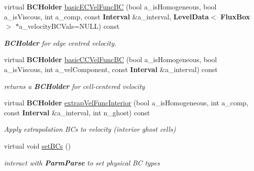 \begin{DoxyCompactItemize}
\item 
\mbox{\label{class_phys_b_c_util_a9c5eb718c29d7e1ac16253ccbf365dd2}} 
virtual \textbf{ B\+C\+Holder} \hyperlink{class_phys_b_c_util_a9c5eb718c29d7e1ac16253ccbf365dd2}{basic\+E\+C\+Vel\+Func\+BC} (bool a\+\_\+is\+Homogeneous, bool a\+\_\+is\+Viscous, int a\+\_\+comp, const \textbf{ Interval} \&a\+\_\+interval, \textbf{ Level\+Data}$<$ \textbf{ Flux\+Box} $>$ $\ast$a\+\_\+velocity\+B\+C\+Vals=N\+U\+LL) const
\begin{DoxyCompactList}\small\item\em \textbf{ B\+C\+Holder} for edge centred velocity. \end{DoxyCompactList}\item 
\mbox{\label{class_phys_b_c_util_a696dca9e5f67f8d3f1556b0b034bfbaf}} 
virtual \textbf{ B\+C\+Holder} \hyperlink{class_phys_b_c_util_a696dca9e5f67f8d3f1556b0b034bfbaf}{basic\+C\+C\+Vel\+Func\+BC} (bool a\+\_\+is\+Homogeneous, bool a\+\_\+is\+Viscous, int a\+\_\+vel\+Component, const \textbf{ Interval} \&a\+\_\+interval) const
\begin{DoxyCompactList}\small\item\em returns a \textbf{ B\+C\+Holder} for cell-\/centered velocity \end{DoxyCompactList}\item 
\mbox{\label{class_phys_b_c_util_a0da6bf78ee652955fa50aa3d5f439fa4}} 
virtual \textbf{ B\+C\+Holder} \hyperlink{class_phys_b_c_util_a0da6bf78ee652955fa50aa3d5f439fa4}{extrap\+Vel\+Func\+Interior} (bool a\+\_\+is\+Homogeneous, int a\+\_\+comp, const \textbf{ Interval} \&a\+\_\+interval, int n\+\_\+ghost) const
\begin{DoxyCompactList}\small\item\em Apply extrapolation B\+Cs to velocity (interior ghost cells) \end{DoxyCompactList}\item 
\mbox{\label{class_phys_b_c_util_a5abe105b9a924f6401b78ab6a5b4b1ab}} 
virtual void \hyperlink{class_phys_b_c_util_a5abe105b9a924f6401b78ab6a5b4b1ab}{set\+B\+Cs} ()
\begin{DoxyCompactList}\small\item\em interact with \textbf{ Parm\+Parse} to set physical BC types \end{DoxyCompactList}\end{DoxyCompactItemize}
